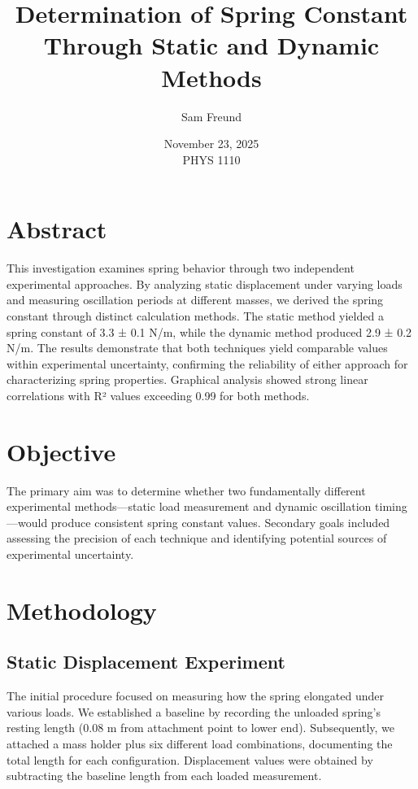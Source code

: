 \documentclass[12pt]{article}
\title{Determination of Spring Constant Through Static and Dynamic Methods}
\author{Sam Freund}
\date{November 23, 2025 \\ PHYS 1110}
\begin{document}
\maketitle
\thispagestyle{empty}
\newpage

\section*{Abstract}

This investigation examines spring behavior through two independent experimental approaches. By analyzing static displacement under varying loads and measuring oscillation periods at different masses, we derived the spring constant through distinct calculation methods. The static method yielded a spring constant of 3.3 ± 0.1 N/m, while the dynamic method produced 2.9 ± 0.2 N/m. The results demonstrate that both techniques yield comparable values within experimental uncertainty, confirming the reliability of either approach for characterizing spring properties. Graphical analysis showed strong linear correlations with R² values exceeding 0.99 for both methods.

\section*{Objective}

The primary aim was to determine whether two fundamentally different experimental methods—static load measurement and dynamic oscillation timing—would produce consistent spring constant values. Secondary goals included assessing the precision of each technique and identifying potential sources of experimental uncertainty.

\section*{Methodology}

\subsection*{Static Displacement Experiment}

The initial procedure focused on measuring how the spring elongated under various loads. We established a baseline by recording the unloaded spring's resting length (0.08 m from attachment point to lower end). Subsequently, we attached a mass holder plus six different load combinations, documenting the total length for each configuration. Displacement values were obtained by subtracting the baseline length from each loaded measurement.
\end{document}
